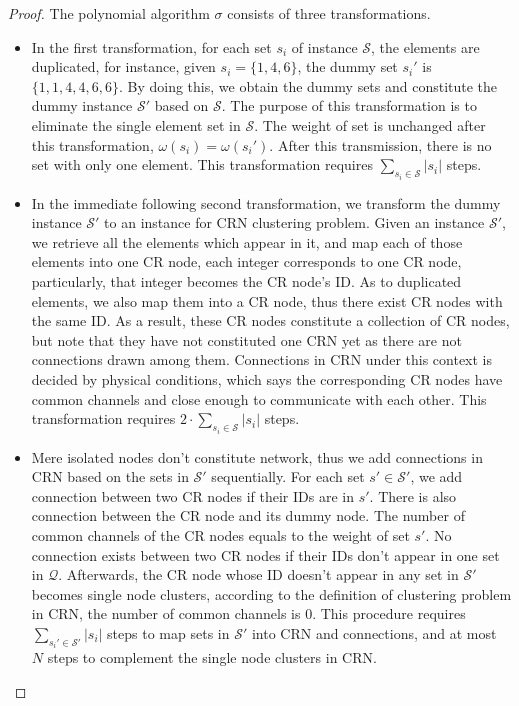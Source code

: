 \begin{proof}
The polynomial algorithm $\sigma$ consists of three transformations.
\begin{itemize}
\item In the first transformation, for each set $s_i$ of instance $\mathcal{S}$, the elements are duplicated, for instance, given $s_i=\{1, 4, 6\}$, the dummy set $s_i'$ is $\{1,1,4,4,6,6\}$.
By doing this, we obtain the dummy sets and constitute the dummy instance $\mathcal{S}'$ based on $\mathcal{S}$.
The purpose of this transformation is to eliminate the single element set in $\mathcal{S}$.
The weight of set is unchanged after this transformation, \ie $\omega(s_i)=\omega(s_i')$.
After this transmission, there is no set with only one element.
This transformation requires $\sum_{s_i \in \mathcal{S}} |s_i|$ steps.
\item In the immediate following second transformation, we transform the dummy instance $\mathcal{S}'$ to an instance for CRN clustering problem.
Given an instance $\mathcal{S}'$, we retrieve all the elements which appear in it, and map each of those elements into one CR node, \ie each integer corresponds to one CR node, particularly, that integer becomes the CR node's ID.
As to duplicated elements, we also map them into a CR node, thus there exist CR nodes with the same ID.
As a result, these CR nodes constitute a collection of CR nodes, but note that they have not constituted one CRN yet as there are not connections drawn among them.
Connections in CRN under this context is decided by physical conditions, which says the corresponding CR nodes have common channels and close enough to communicate with each other.
This transformation requires $2\cdot\sum_{s_i \in \mathcal{S}} |s_i|$ steps.
\item Mere isolated nodes don't constitute network, thus we add connections in CRN based on the sets in $\mathcal{S}'$ sequentially.
For each set $s'\in \mathcal{S}'$, we add connection between two CR nodes if their IDs are in $s'$.
There is also connection between the CR node and its dummy node.
The number of common channels of the CR nodes equals to the weight of set $s'$.
No connection exists between two CR nodes if their IDs don't appear in one set in $\mathcal{Q}$.
Afterwards, the CR node whose ID doesn't appear in any set in $\mathcal{S'}$ becomes single node clusters, according to the definition of clustering problem in CRN, the number of common channels is 0.
This procedure requires $\sum_{s_i' \in \mathcal{S}'} |s_i|$ steps to map sets in $\mathcal{S}'$ into CRN and connections, and at most $N$ steps to complement the single node clusters in CRN.


\end{itemize}
\end{proof}
